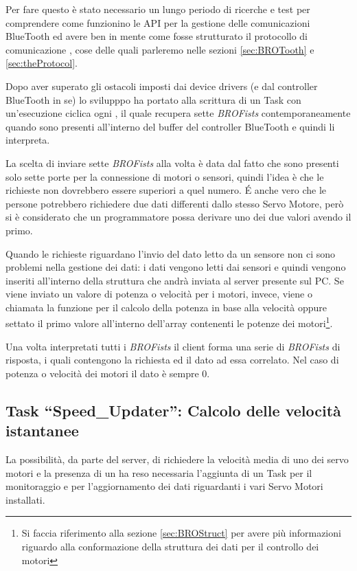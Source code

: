 Per fare questo è stato necessario un lungo periodo di ricerche e test per
comprendere come funzionino le API per la gestione delle comunicazioni
BlueTooth ed avere ben in mente come fosse strutturato il protocollo di
comunicazione \BROFist{}, cose delle quali parleremo nelle sezioni
\ref{sec:BROTooth} e \ref{sec:theProtocol}.

Dopo aver superato gli ostacoli imposti dai device drivers (e dal
controller BlueTooth in se) lo svilupppo ha portato alla scrittura di un
Task con un'esecuzione ciclica ogni , il quale recupera sette
\emph{BROFists} contemporaneamente quando sono presenti all'interno del
buffer del controller BlueTooth e quindi li interpreta.

La scelta di inviare sette \emph{BROFists} alla volta è data dal fatto che
sono presenti solo sette porte per la connessione di motori o sensori,
quindi l'idea è che le richieste non dovrebbero essere superiori a
quel numero. \'E anche vero che le persone potrebbero richiedere due dati
differenti dallo stesso Servo Motore, però si è considerato che un
programmatore possa derivare uno dei due valori avendo il primo.

Quando le richieste riguardano l'invio del dato letto da un sensore non ci
sono problemi nella gestione dei dati: i dati vengono letti dai sensori e
quindi vengono inseriti all'interno della struttura che andrà inviata al
server presente sul PC. Se viene inviato un valore di potenza o velocità
per i motori, invece, viene o chiamata la funzione per il calcolo della
potenza in base alla velocità oppure settato il primo valore all'interno
dell'array contenenti le potenze dei motori\footnote{Si faccia riferimento
alla sezione \ref{sec:BROStruct} per avere più informazioni riguardo alla
conformazione della struttura dei dati per il controllo dei motori}.

Una volta interpretati tutti i \emph{BROFists} il client forma una serie di
\emph{BROFists} di risposta, i quali contengono la richiesta ed il dato ad
essa correlato. Nel caso di potenza o velocità dei motori il dato è sempre
$0$.

\subsection[Task ``Speed\_Updater'']{Task ``Speed\_Updater'': Calcolo delle
velocità istantanee}\label{sec:BROSpdS}
La possibilità, da parte del server, di richiedere la velocità media di uno
dei servo motori e la presenza di un \PID{} ha reso necessaria l'aggiunta
di un Task per il monitoraggio e per l'aggiornamento dei dati riguardanti i
vari Servo Motori installati.


